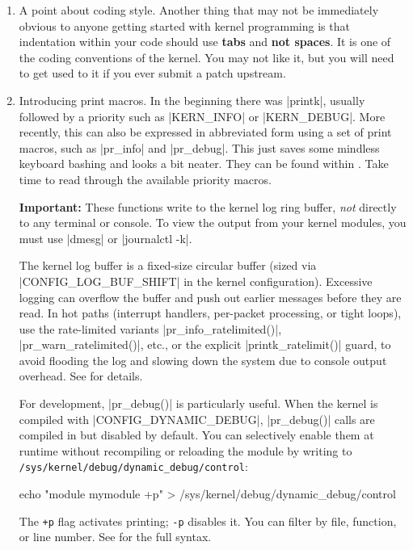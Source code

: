 \documentclass[10pt, oneside]{book}
\begin{document}
\begin{enumerate}
  \item A point about coding style.
        Another thing that may not be immediately obvious to anyone getting started with kernel programming is that indentation within your code should use \textbf{tabs} and \textbf{not spaces}.
        It is one of the coding conventions of the kernel.
        You may not like it, but you will need to get used to it if you ever submit a patch upstream.

  \item Introducing print macros.
  \label{sec:printk}
        In the beginning there was \cpp|printk|, usually followed by a priority such as \cpp|KERN_INFO| or \cpp|KERN_DEBUG|.
        More recently, this can also be expressed in abbreviated form using a set of print macros, such as \cpp|pr_info| and \cpp|pr_debug|.
        This just saves some mindless keyboard bashing and looks a bit neater.
        They can be found within .
        Take time to read through the available priority macros.

        \textbf{Important:} These functions write to the kernel log ring buffer, \emph{not} directly to any terminal or console.
        To view the output from your kernel modules, you must use \sh|dmesg| or \sh|journalctl -k|.

        The kernel log buffer is a fixed-size circular buffer (sized via \cpp|CONFIG_LOG_BUF_SHIFT| in the kernel configuration).
        Excessive logging can overflow the buffer and push out earlier messages before they are read.
        In hot paths (interrupt handlers, per-packet processing, or tight loops), use the rate-limited variants \cpp|pr_info_ratelimited()|, \cpp|pr_warn_ratelimited()|, etc., or the explicit \cpp|printk_ratelimit()| guard, to avoid flooding the log and slowing down the system due to console output overhead.
        See  for details.

        For development, \cpp|pr_debug()| is particularly useful.
        When the kernel is compiled with \cpp|CONFIG_DYNAMIC_DEBUG|, \cpp|pr_debug()| calls are compiled in but disabled by default.
        You can selectively enable them at runtime without recompiling or reloading the module by writing to \verb|/sys/kernel/debug/dynamic_debug/control|:
        \begin{codebash}
echo "module mymodule +p" > /sys/kernel/debug/dynamic_debug/control
        \end{codebash}
        The \verb|+p| flag activates printing; \verb|-p| disables it.
        You can filter by file, function, or line number.
        See  for the full syntax.


\end{enumerate}
\end{document}
